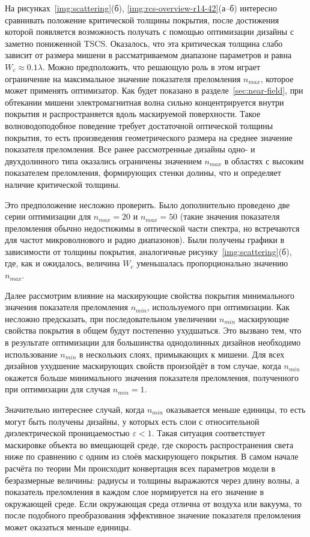 На рисунках~\ref{img:scattering}(б),
\ref{img:rcs-overview-r14-42}(а--б) интересно сравнивать положение
критической толщины покрытия, после достижения которой появляется
возможность получать с помощью оптимизации дизайны с заметно
пониженной TSCS.  Оказалось, что эта критическая толщина слабо зависит
от размера мишени в рассматриваемом диапазоне параметров и равна
${W_c \approx 0.1\lambda}$.  Можно предположить, что решающую роль в
этом играет ограничение на максимальное значение показателя
преломления $n_{max}$, которое может применять оптимизатор.  Как будет
показано в разделе~\ref{sec:near-field}, при обтекании мишени
электромагнитная волна сильно концентрируется внутри покрытия
и распространяется вдоль маскируемой поверхности.  Такое волноводоподобное
поведение требует достаточной оптической толщины покрытия, то есть
произведения геометрического размера на среднее значение показателя
преломления. Все ранее рассмотренные дизайны одно- и двухдолинного
типа оказались ограничены значением $n_{max}$ в областях с высоким
показателем преломления, формирующих стенки долины, что и определяет
наличие критической толщины.

Это предположение несложно проверить. Было дополнительно проведено
две серии оптимизации для $n_{max}=20$ и $n_{max}=50$ (такие значения
показателя преломления обычно недостижимы в оптической части спектра,
но встречаются для частот микроволнового и радио диапазонов).
Были получены графики в зависимости от толщины покрытия, аналогичные
рисунку~\ref{img:scattering}(б), где, как и ожидалось, величина $W_c$
уменьшалась пропорционально значению $n_{max}$.

Далее рассмотрим влияние на маскирующие свойства покрытия минимального
значения показателя преломления $n_{min}$, используемого при
оптимизации.  Как несложно предсказать, при последовательном
увеличении $n_{min}$ маскирующие свойства покрытия в общем будут
постепенно ухудшаться. Это вызвано тем, что в результате оптимизации
для большинства однодолинных дизайнов необходимо использование
$n_{min}$ в нескольких слоях, примыкающих к мишени. Для всех дизайнов
ухудшение маскирующих свойств произойдёт в том случае, когда $n_{min}$
окажется больше минимального значения показателя преломления,
полученного при оптимизации для случая $n_{min}=1$. 

Значительно интереснее случай, когда $n_{min}$ оказывается меньше
единицы, то есть могут быть получены дизайны, у которых есть слои с
относительной диэлектрической проницаемостью $\varepsilon <1$.  Такая
ситуация соответствует маскировке объекта во вмещающей среде, где
скорость распространения света ниже по сравнению с одним из слоёв
маскирующего покрытия.  В самом начале расчёта по теории Ми происходит
конвертация всех параметров модели в безразмерные величины: радиусы и
толщины выражаются через длину волны, а показатель преломления в
каждом слое нормируется на его значение в окружающей среде. Если
окружающая среда отлична от воздуха или вакуума, то после подобного
преобразования эффективное значение показателя преломления может
оказаться меньше единицы.


